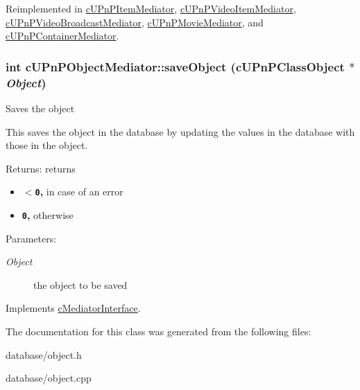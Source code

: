 Reimplemented in \hyperlink{classcUPnPItemMediator_6d954b1cfdc4a7d55981c6ebff9d6d04}{cUPnPItemMediator}, \hyperlink{classcUPnPVideoItemMediator_984e10738bca46ce38307d5f60e26bd3}{cUPnPVideoItemMediator}, \hyperlink{classcUPnPVideoBroadcastMediator_822f9c93928a7dbe9491c8cccbf53f95}{cUPnPVideoBroadcastMediator}, \hyperlink{classcUPnPMovieMediator_61ab6dcaf2417898428ddf1f635788b7}{cUPnPMovieMediator}, and \hyperlink{classcUPnPContainerMediator_1caa4625fca42940ba36999a71ac49ec}{cUPnPContainerMediator}.\hypertarget{classcUPnPObjectMediator_c200f88239b8940d9d38cbe04c3e961e}{
\subsubsection[{saveObject}]{\setlength{\rightskip}{0pt plus 5cm}int cUPnPObjectMediator::saveObject ({\bf cUPnPClassObject} $\ast$ {\em Object})}}
\label{classcUPnPObjectMediator_c200f88239b8940d9d38cbe04c3e961e}


Saves the object

This saves the object in the database by updating the values in the database with those in the object.

\begin{Desc}
\item[Returns:]returns\begin{itemize}
\item {\bf {\tt $<$0},} in case of an error\item {\bf {\tt 0},} otherwise \end{itemize}
\end{Desc}
\begin{Desc}
\item[Parameters:]
\begin{description}
\item[{\em Object}]the object to be saved \end{description}
\end{Desc}
 

Implements \hyperlink{classcMediatorInterface_a2f40e697f499c64cfd007aa70e3da7e}{cMediatorInterface}.

The documentation for this class was generated from the following files:\begin{CompactItemize}
\item 
database/object.h\item 
database/object.cpp\end{CompactItemize}
